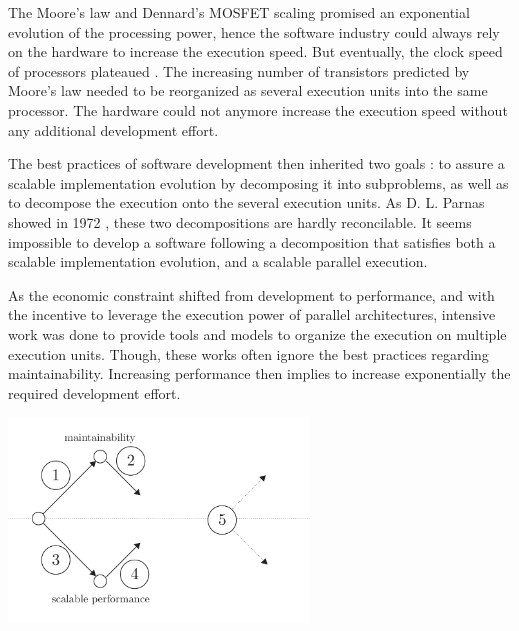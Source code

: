 The Moore's law \cite{Moore1965} and Dennard's MOSFET scaling \cite{Dennard2007} promised an exponential evolution of the processing power, hence the software industry could always rely on the hardware to increase the execution speed.
But eventually, the clock speed of processors plateaued \cite{Bohr2007}.
The increasing number of transistors predicted by Moore's law needed to be reorganized as several execution units into the same processor.
The hardware could not anymore increase the execution speed without any additional development effort.

The best practices of software development then inherited two goals : to assure a scalable implementation evolution by decomposing it into subproblems, as well as to decompose the execution onto the several execution units.
As D. L. Parnas showed in 1972 \cite{Parnas1972}, these two decompositions are hardly reconcilable.
It seems impossible to develop a software following a decomposition that satisfies both a scalable implementation evolution, and a scalable parallel execution.

As the economic constraint shifted from development to performance, and with the incentive to leverage the execution power of parallel architectures, intensive work was done to provide tools and models to organize the execution on multiple execution units.
Though, these works often ignore the best practices regarding maintainability.
Increasing performance then implies to increase exponentially the required development effort.


\begin{center}
\includegraphics[width=0.6\textwidth]{../ressources/state-of-the-art.pdf}
\end{center}

